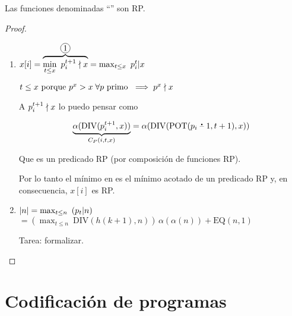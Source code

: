 \begin{teorema}{}{}
    Las funciones denominadas ``''
    son RP.
\end{teorema}

\begin{proof} \phantom{.}

    \begin{enumerate}
        \item $x[i] = 
            \overbrace{\min_{t \leq x}{~ \notdivides{p_{i}^{t+1}}{x}}}^{%
            \circled{1}} 
            = \max_{t \leq x}{~ \divides{p_i^t}{x}}$
            
            $t \leq x \text{ porque } p^x > x \; \forall p \text{ primo } 
                \implies \notdivides{p^x}{x}$

            A $\notdivides{p_{i}^{t+1}}{x}$ lo puedo pensar como

            \begin{gather*}
                \underbrace{\alpha( \mathrm{DIV}(p_i^{t+1}, x))}_{%
                C_P(i,t,x)}
                = \alpha(\mathrm{DIV}(\mathrm{POT}(p_i \restatruncada 1, t+1),
                x))
            \end{gather*}

            Que es un predicado RP (por composición de funciones RP).

            Por lo tanto el mínimo en  es el mínimo acotado de
            un predicado RP y, en consecuencia, $x[i]$ es RP.

        \item $|n| = \max_{t \leq n}{~ (\divides{p_t}{n})}$
            $= \left(\max_{t \leq n}{~ \mathrm{DIV}(h(k+1), n)}\right) \,
            \alpha(\alpha(n)) + \mathrm{EQ}(n,1)$

            Tarea: formalizar.
    \end{enumerate}
\end{proof}

\section{Codificación de programas}

